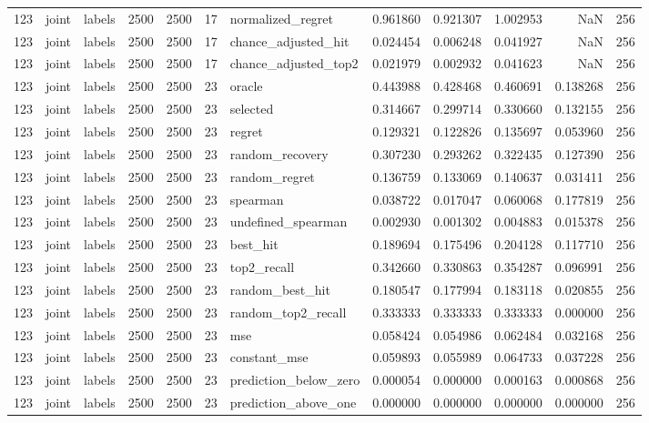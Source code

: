 \begin{tabular}{rllrrrlrrrrr}
123 & joint & labels & 2500 & 2500 & 17 & normalized_regret & 0.961860 & 0.921307 & 1.002953 & NaN & 256 \\
123 & joint & labels & 2500 & 2500 & 17 & chance_adjusted_hit & 0.024454 & 0.006248 & 0.041927 & NaN & 256 \\
123 & joint & labels & 2500 & 2500 & 17 & chance_adjusted_top2 & 0.021979 & 0.002932 & 0.041623 & NaN & 256 \\
123 & joint & labels & 2500 & 2500 & 23 & oracle & 0.443988 & 0.428468 & 0.460691 & 0.138268 & 256 \\
123 & joint & labels & 2500 & 2500 & 23 & selected & 0.314667 & 0.299714 & 0.330660 & 0.132155 & 256 \\
123 & joint & labels & 2500 & 2500 & 23 & regret & 0.129321 & 0.122826 & 0.135697 & 0.053960 & 256 \\
123 & joint & labels & 2500 & 2500 & 23 & random_recovery & 0.307230 & 0.293262 & 0.322435 & 0.127390 & 256 \\
123 & joint & labels & 2500 & 2500 & 23 & random_regret & 0.136759 & 0.133069 & 0.140637 & 0.031411 & 256 \\
123 & joint & labels & 2500 & 2500 & 23 & spearman & 0.038722 & 0.017047 & 0.060068 & 0.177819 & 256 \\
123 & joint & labels & 2500 & 2500 & 23 & undefined_spearman & 0.002930 & 0.001302 & 0.004883 & 0.015378 & 256 \\
123 & joint & labels & 2500 & 2500 & 23 & best_hit & 0.189694 & 0.175496 & 0.204128 & 0.117710 & 256 \\
123 & joint & labels & 2500 & 2500 & 23 & top2_recall & 0.342660 & 0.330863 & 0.354287 & 0.096991 & 256 \\
123 & joint & labels & 2500 & 2500 & 23 & random_best_hit & 0.180547 & 0.177994 & 0.183118 & 0.020855 & 256 \\
123 & joint & labels & 2500 & 2500 & 23 & random_top2_recall & 0.333333 & 0.333333 & 0.333333 & 0.000000 & 256 \\
123 & joint & labels & 2500 & 2500 & 23 & mse & 0.058424 & 0.054986 & 0.062484 & 0.032168 & 256 \\
123 & joint & labels & 2500 & 2500 & 23 & constant_mse & 0.059893 & 0.055989 & 0.064733 & 0.037228 & 256 \\
123 & joint & labels & 2500 & 2500 & 23 & prediction_below_zero & 0.000054 & 0.000000 & 0.000163 & 0.000868 & 256 \\
123 & joint & labels & 2500 & 2500 & 23 & prediction_above_one & 0.000000 & 0.000000 & 0.000000 & 0.000000 & 256 \\

\end{tabular}
